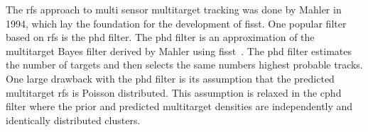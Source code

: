 The \gls{rfs} approach to multi sensor multitarget tracking was done by Mahler in 1994, which lay the foundation for the development of \gls{fisst}. One popular filter based on \gls{rfs} is the \gls{phd} filter. The \gls{phd} filter is an approximation of the multitarget Bayes filter derived by Mahler using \gls{fisst}~\cite{Vo2015}. The \gls{phd} filter estimates the number of targets and then selects the same numbers highest probable tracks. One large drawback with the \gls{phd} filter is its assumption that the predicted multitarget \gls{rfs} is Poisson distributed. This assumption is relaxed in the \gls{cphd} filter where the prior and predicted multitarget densities are independently and identically distributed clusters.